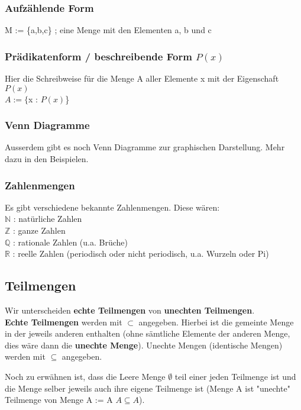 \documentclass[a4paper,12pt]{article}
\begin{document}
\subsubsection{Aufzählende Form}
M := \{a,b,c\} ; eine Menge mit den Elementen a, b und c

\subsubsection{Prädikatenform / beschreibende Form \( P(x) \)}
Hier die Schreibweise für die Menge A aller Elemente x mit der Eigenschaft \( P(x) \) \\
$A := \{$x : \( P(x) \)\} \\

\subsubsection{Venn Diagramme}
Ausserdem gibt es noch Venn Diagramme zur graphischen Darstellung. Mehr dazu in den Beispielen.

\subsubsection{Zahlenmengen}
Es gibt verschiedene bekannte Zahlenmengen. Diese wären: \\
$\mathbb{N}$ : natürliche Zahlen \\
$\mathbb{Z}$ : ganze Zahlen \\
$\mathbb{Q}$ : rationale Zahlen (u.a. Brüche) \\
$\mathbb{R}$ : reelle Zahlen (periodisch oder nicht periodisch, u.a. Wurzeln oder Pi)

\subsection{Teilmengen}
Wir unterscheiden \textbf{echte Teilmengen} von \textbf{unechten Teilmengen}. \\
\textbf{Echte Teilmengen} werden mit $\subset$ angegeben. Hierbei ist die gemeinte Menge in der jeweils anderen enthalten (ohne \textnormal{sämtliche} Elemente der anderen Menge, dies \textnormal{wäre} dann die \textbf{unechte Menge}). Unechte Mengen (identische Mengen) werden mit $\subseteq$ angegeben.

Noch zu erwähnen ist, dass die Leere Menge $\emptyset$ teil einer jeden Teilmenge ist und die Menge selber jeweils auch ihre eigene Teilmenge ist (Menge A ist "unechte" Teilmenge von Menge A := A $A \subseteq A$).
\end{document}
